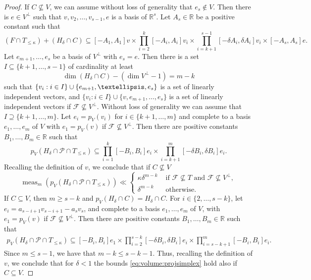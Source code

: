 \documentclass[11pt]{article}
\numberwithin{equation}{section}
\newcommand\RR{\mathbb{R}}
\DeclareMathOperator{\meas}{meas}
\theoremstyle{definition}
\numberwithin{theorem}{section}
\begin{document}
\begin{proof}
If $C\nsubseteq V$, we can assume without loss of generality that $e_s\notin V$. Then there is $e\in V^{\perp}$ such that $v, v_2,\dots,v_{s-1},e$ is a basis of $\RR^s$.
Let $A_s\in\RR$ be a positive constant such that
\begin{equation*}
(F\cap T_{\leq\kappa})+(H_\delta\cap C)\subseteq [- A_1, A_1] v\times \prod_{i=2}^{k}[-A_i, A_i]v_i\times \prod_{i=k+1}^{s-1}[-\delta A_i, \delta A_i]v_i\times [-A_s, A_s]e.
\end{equation*}
Let $e_{m+1},\dots, e_s$ be a basis of $V^{\perp}$ with $e_s\!=\!e$. Then there is a set \hbox{$I\subseteq\{k+1,\dots,s-1\}$} of cardinality at least
\[
\dim (H_\delta\cap C)-(\dim V^{\perp}-1)=m-k
\]
such that $\{v_i:\nobreak i\in\nobreak I\}\cup\{e_{m+1},\dots,e_s\}$ is a set of linearly independent vectors, and $\{v_i:i\in I\}\cup\{v, e_{m+1},\dots,e_s\}$ is a set of linearly independent vectors if $\mathcal F\nsubseteq V^{\perp}$.
Without loss of generality we can assume that $I\supseteq\{k+1,\dots,m\}$. Let $e_i=p_V(v_i)$ for $i\in\{k+1,\dots,m\}$ and complete to a basis $e_1,\dots,e_m$ of $V$ with $e_1=p_V(v)$ if $\mathcal F\nsubseteq V^{\perp}$.
Then there are positive constants $B_1,\dots,B_m\in \RR$ such that
\begin{equation*}\label{eq:volume:CnotinV}
p_V(H_\delta\cap\mathcal P\cap T_{\leq\kappa})\subseteq \prod_{i=1}^{k}[-B_i, B_i]e_i\times \prod_{i=k+1}^{m}[-\delta B_i, \delta B_i]e_i.
\end{equation*}
Recalling the definition of $v$, we conclude that if $C\nsubseteq V$
\begin{equation}\label{eq:volume:projsimplex}
\meas_m(p_V(H_\delta\cap\mathcal P\cap T_{\leq\kappa}))\ll\begin{cases}\kappa\delta^{m-k} & \text{ if } \mathcal F\nsubseteq T \text{ and } \mathcal F\nsubseteq V^{\perp}, \\
\delta^{m-k} & \text{ otherwise.}
\end{cases}
\end{equation}
If $C\subseteq V$, then $m\geq s-k$ and $p_V(H_\delta\cap C)=H_\delta\cap C$. For $i\in\{2,\dots,s-k\}$, let $e_i= a_{s-i+1}v_{s-i+1}-a_sv_s$, and complete to a basis $e_1,\dots,e_m$ of $V$, with $e_1=p_V(v)$ if $\mathcal F\nsubseteq V^{\perp}$. Then there are positive constants $B_1,\dots,B_m\in\RR$ such that
\begin{gather*}\label{eq:volume:CinV}
p_V(H_\delta\cap\mathcal P\cap T_{\leq\kappa})\subseteq [- B_i, B_i]e_1 \times \prod_{i=2}^{s-k}[-\delta B_i, \delta B_i]e_i\times \prod_{i=s-k+1}^{m}[- B_i, B_i]e_i.
\end{gather*}
Since $m\leq s-1$, we have that $m-k\leq s-k-1$. Thus,
recalling the definition of $v$, we conclude that for $\delta < 1$ the bounds \eqref{eq:volume:projsimplex} hold also if $C\subseteq V$.


\end{proof}
\end{document}

